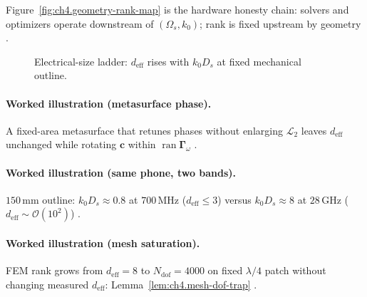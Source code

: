 Figure~\ref{fig:ch4.geometry-rank-map} is the hardware honesty chain: solvers and optimizers operate downstream of \((\Omega_{s},k_{0})\); rank is fixed
upstream by geometry \cite{stratton1941,harrington2001,devaney2004}.

\begin{figure}[t]
\centering
{}
\caption{Electrical-size ladder: \(d_{\mathrm{eff}}\) rises with \(k_{0}D_{s}\) at fixed mechanical outline.}
\label{fig:ch4.electrical-size-ladder}
\end{figure}

\paragraph{Worked illustration (metasurface phase).}
A fixed-area metasurface that retunes phases without enlarging \(\mathcal{L}_{2}\) leaves \(d_{\mathrm{eff}}\) unchanged while rotating \(\mathbf{c}\)
within \(\operatorname{ran}\boldsymbol{\Gamma}_\omega\) \cite{stratton1941,harrington2001,hansen1988,devaney2004}.

\paragraph{Worked illustration (same phone, two bands).}
\(150\,\mathrm{mm}\) outline: \(k_{0}D_{s}\approx0.8\) at \(700\,\mathrm{MHz}\) (\(d_{\mathrm{eff}}\le3\)) versus \(k_{0}D_{s}\approx8\) at
\(28\,\mathrm{GHz}\) (\(d_{\mathrm{eff}}\sim\mathcal{O}(10^{2})\)) \cite{harrington2001,collin2001,hansen1988,jackson1999}.

\paragraph{Worked illustration (mesh saturation).}
FEM rank grows from \(d_{\mathrm{eff}}=8\) to \(N_{\mathrm{dof}}=4000\) on fixed \(\lambda/4\) patch without changing measured \(d_{\mathrm{eff}}\):
Lemma~\ref{lem:ch4.mesh-dof-trap} \cite{harrington2001,devaney2004,hansen1988}.

